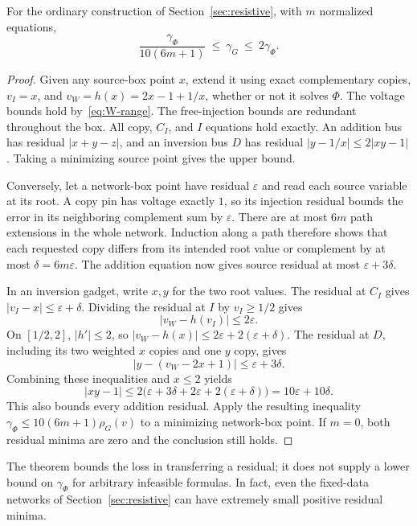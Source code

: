 \begin{theorem}
\label{thm:residual-transfer}
For the ordinary construction of Section~\ref{sec:resistive}, with $m$
normalized equations,
\begin{equation}
 \frac{\gamma_\Phi}{10(6m+1)}\ \le\ \gamma_G
       \ \le\ 2\gamma_\Phi.
 \label{eq:residual-transfer}
\end{equation}
\end{theorem}
\begin{proof}
Given any source-box point $x$, extend it using exact complementary copies,
$v_I=x$, and $v_W=h(x)=2x-1+1/x$, whether or not it solves $\Phi$.
The voltage bounds hold by~\eqref{eq:W-range}. The free-injection bounds
are redundant throughout the box. All copy, $C_I$, and $I$ equations hold
exactly. An addition bus has residual $|x+y-z|$, and an inversion bus $D$
has residual $|y-1/x|\le2|xy-1|$. Taking a minimizing source point gives
the upper bound.

Conversely, let a network-box point have residual $\varepsilon$ and read
each source variable at its root. A copy pin has voltage exactly $1$, so its
injection residual bounds the error in its neighboring complement sum by
$\varepsilon$. There are at most $6m$ path extensions in the whole network.
Induction along a path therefore shows that each requested copy differs from
its intended root value or complement by at most
$\delta=6m\varepsilon$. The addition equation now gives source residual
at most $\varepsilon+3\delta$.

In an inversion gadget, write $x,y$ for the two root values. The residual
at $C_I$ gives $|v_I-x|\le\varepsilon+\delta$. Dividing the residual at
$I$ by $v_I\ge1/2$ gives
\[
 |v_W-h(v_I)|\le2\varepsilon.
\]
On $[1/2,2]$, $|h'|\le2$, so
$|v_W-h(x)|\le2\varepsilon+2(\varepsilon+\delta)$.
The residual at $D$, including its two weighted $x$ copies and one $y$
copy, gives
\[
 |y-(v_W-2x+1)|\le\varepsilon+3\delta.
\]
Combining these inequalities and $x\le2$ yields
\[
 |xy-1|\le2\bigl(\varepsilon+3\delta+2\varepsilon
                        +2(\varepsilon+\delta)\bigr)
           =10\varepsilon+10\delta.
\]
This also bounds every addition residual. Apply the resulting inequality
$\gamma_\Phi\le10(6m+1)\rho_G(v)$ to a minimizing network-box point.
If $m=0$, both residual minima are zero and the conclusion still holds.
\end{proof}

The theorem bounds the loss in transferring a residual; it does not supply
a lower bound on $\gamma_\Phi$ for arbitrary infeasible formulas. In fact,
even the fixed-data networks of Section~\ref{sec:resistive} can have
extremely small positive residual minima.

